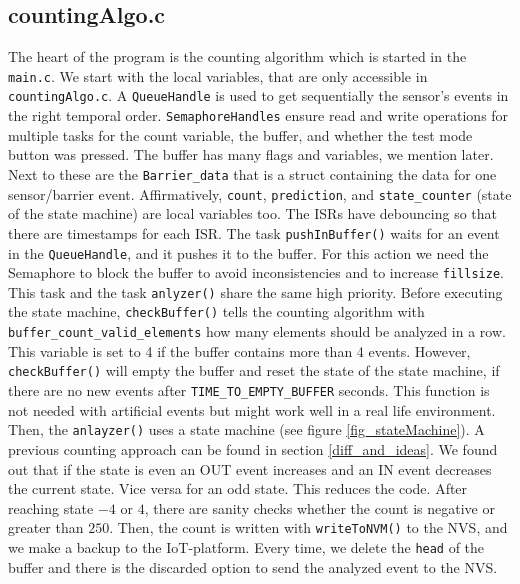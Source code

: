 \subsection{countingAlgo.c}
The heart of the program is the counting algorithm which is started in the \verb!main.c!.
We start with the local variables, that are only accessible in \verb!countingAlgo.c!. A \verb!QueueHandle! is
used to get sequentially the sensor's events in the right temporal order.
\verb!SemaphoreHandles! ensure read and write operations for multiple tasks for the count variable,
the buffer, and whether the test mode button was pressed. The buffer has many flags and variables, we mention
later. Next to these are the \verb!Barrier_data!
that is a struct containing the data for one sensor/barrier event. Affirmatively, \verb!count!,
\verb!prediction!, and \verb!state_counter! (state of the state machine) are local variables too.
The ISRs have debouncing so that there are timestamps for each ISR.
The task \verb!pushInBuffer()! waits for an event in the \verb!QueueHandle!, and it pushes it to the buffer.
For this action we need the Semaphore to block the buffer to avoid inconsistencies and
to increase \verb!fillsize!.
This task and the task \verb!anlyzer()! share the same high priority.
Before executing the state machine, \verb!checkBuffer()! tells the counting algorithm with
\verb!buffer_count_valid_elements! how many elements should be analyzed in a row. This variable
is set to 4 if the buffer contains more than 4 events. However, \verb!checkBuffer()! will empty the buffer and
reset the state of the state machine, if there
are no new events after \verb!TIME_TO_EMPTY_BUFFER! seconds. This function is not needed with artificial events
but might work well in a real life environment. Then,
the \verb!anlayzer()! uses a state
machine (see figure \ref{fig_stateMachine}). A previous counting approach can be found in section \ref{diff_and_ideas}.
We found out that if the state is even an OUT event increases and an IN event decreases the current
state. Vice versa for an odd state. This reduces the code. After reaching state $-4$ or $4$, there are sanity checks
whether the count is negative or greater than $250$. Then, the count is written with \verb!writeToNVM()! to the
NVS, and we make a backup to the IoT-platform. Every time, we delete the \verb!head! of the buffer and there is
the discarded option to send the analyzed event to the NVS.\\

